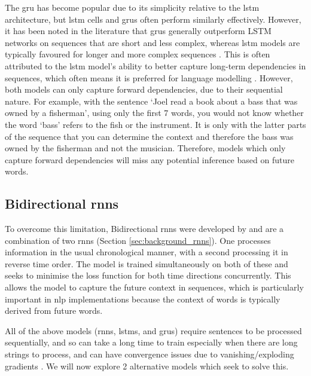 The \acrlong{gru} has become popular due to its simplicity relative to the \acrshort{lstm} architecture, but \acrlong{lstm} cells and \acrlong{gru}s often perform similarly effectively. However, it has been noted in the literature that \acrshort{gru}s generally outperform LSTM networks on sequences that are short and less complex, whereas \acrshort{lstm} models are typically favoured for longer and more complex sequences \citep{cahuantzi2023comparison}. This is often attributed to the \acrshort{lstm} model's ability to better capture long-term dependencies in sequences, which often means it is preferred for language modelling \citep{Irie2016}. However, both models can only capture forward dependencies, due to their sequential nature. For example, with the sentence `Joel read a book about a bass that was owned by a fisherman', using only the first 7 words, you would not know whether the word `bass' refers to the fish or the instrument. It is only with the latter parts of the sequence that you can determine the context and therefore the bass was owned by the fisherman and not the musician. Therefore, models which only capture forward dependencies will miss any potential inference based on future words. 

\subsection{Bidirectional \acrlong{rnn}s}
\label{sec:background_bidirectional_rnns}

To overcome this limitation, Bidirectional \acrshort{rnn}s were developed by \citet{Schuster} and are a combination of two \acrshort{rnn}s (Section \ref{sec:background_rnns}). One processes information in the usual chronological manner, with a second processing it in reverse time order. The model is trained simultaneously on both of these and seeks to minimise the loss function for both time directions concurrently. This allows the model to capture the future context in sequences, which is particularly important in \acrshort{nlp} implementations because the context of words is typically derived from future words.

All of the above models (\acrshort{rnn}s, \acrshort{lstm}s, and \acrshort{gru}s) require sentences to be processed sequentially, and so can take a long time to train especially when there are long strings to process, and can have convergence issues due to vanishing/exploding gradients \citep{vaswani2017attention, Lipton}. We will now explore 2 alternative models which seek to solve this.

